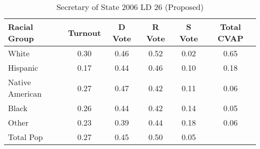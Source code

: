 \begin{table}[htb]
\begin{center}
\caption{Secretary of State 2006 LD 26 (Proposed)}
\label{sos06_cvap_ld_26}
\begin{tabular}{lccccc}
  \hline
Racial Group & Turnout & D Vote & R Vote & S Vote & Total CVAP \\ 
  \hline
White & 0.30 & 0.46 & 0.52 & 0.02 & 0.65 \\ 
  Hispanic & 0.17 & 0.44 & 0.46 & 0.10 & 0.18 \\ 
  Native American & 0.27 & 0.47 & 0.42 & 0.11 & 0.06 \\ 
  Black & 0.26 & 0.44 & 0.42 & 0.14 & 0.05 \\ 
  Other & 0.23 & 0.39 & 0.44 & 0.18 & 0.06 \\ 
  Total Pop & 0.27 & 0.45 & 0.50 & 0.05 &  \\ 
   \hline
\end{tabular}
\end{center}
\end{table}
